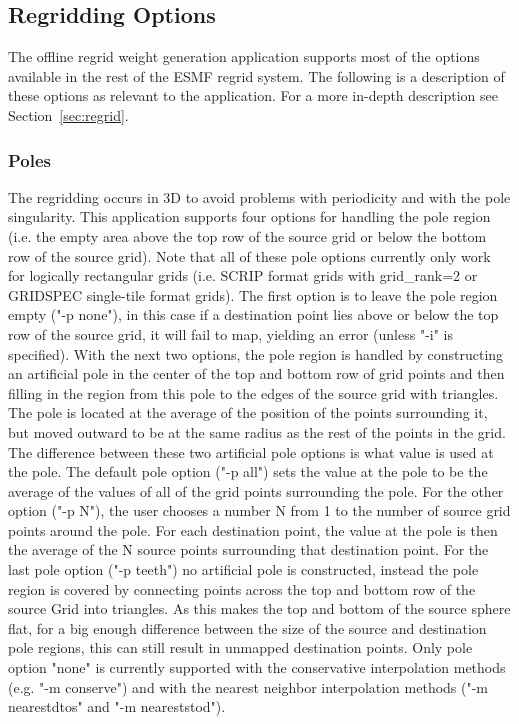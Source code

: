 \subsection{Regridding Options}\label{sec:rwg_options}

 The offline regrid weight generation application supports most of the options available in the rest of the ESMF regrid system. The following is a description of these options as relevant to the application. For a more in-depth description see Section~\ref{sec:regrid}.

\subsubsection{Poles}\label{sec:rwg_poles}
The regridding occurs in 3D to avoid
problems with periodicity and with the pole singularity. This application
supports four options for handling the pole region (i.e. the empty area above the top row of the source grid or below
the bottom row of the source grid).  Note that all of these pole options currently only work for logically rectangular grids (i.e. SCRIP format grids with grid\_rank=2 or GRIDSPEC single-tile format grids). The first option is to leave  the pole region empty ("-p none"), in this
case if a destination point lies above or below the
top row of the source grid, it will fail to map, yielding an error (unless "-i" is specified).
With the next two options, the pole region is handled by constructing
an artificial pole in the center of the top and bottom row of grid points and then filling
in the region from this pole to the edges of the source grid with triangles.
The pole is located at the average of the position of the points surrounding
it, but moved outward to be at the same radius as the rest of the points
in the grid. The difference between these two artificial pole options is what value is used at the pole.
 The default pole option ("-p all") sets the value at the pole to be the average of the values
of all of the grid points surrounding the pole. For the other option ("-p N"), the user chooses
a number N from 1 to the number of source grid points around the pole. For
each destination point, the value at the pole is then the average of the N source points
surrounding that destination point. For the last pole option ("-p teeth") no artificial pole is constructed, instead the
pole region is covered by connecting points across the top and bottom row of the source Grid into triangles. As
this makes the top and bottom of the source sphere flat, for a big enough difference between the size of
the source and destination pole regions, this can still result in unmapped destination points.
Only pole option "none" is currently supported with the conservative interpolation methods (e.g. "-m conserve") and with the
nearest neighbor interpolation methods ("-m nearestdtos" and "-m neareststod").

